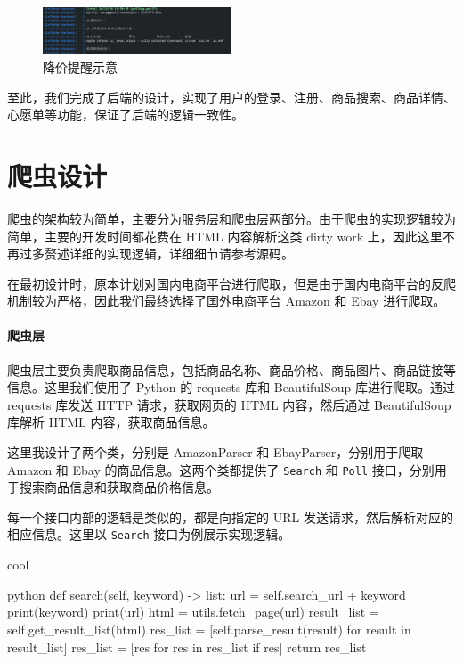 \begin{figure}[H]
\centering
\includegraphics[width=0.5\textwidth]{assets/report/polling.png}
\caption{降价提醒示意}
\end{figure}

至此，我们完成了后端的设计，实现了用户的登录、注册、商品搜索、商品详情、心愿单等功能，保证了后端的逻辑一致性。

\chapter{爬虫设计}

爬虫的架构较为简单，主要分为服务层和爬虫层两部分。由于爬虫的实现逻辑较为简单，主要的开发时间都花费在 HTML 内容解析这类 dirty work 上，因此这里不再过多赘述详细的实现逻辑，详细细节请参考源码。

在最初设计时，原本计划对国内电商平台进行爬取，但是由于国内电商平台的反爬机制较为严格，因此我们最终选择了国外电商平台 Amazon 和 Ebay 进行爬取。

\subsubsection{爬虫层}

爬虫层主要负责爬取商品信息，包括商品名称、商品价格、商品图片、商品链接等信息。这里我们使用了 Python 的 requests 库和 BeautifulSoup 库进行爬取。通过 requests 库发送 HTTP 请求，获取网页的 HTML 内容，然后通过 BeautifulSoup 库解析 HTML 内容，获取商品信息。

这里我设计了两个类，分别是 AmazonParser 和 EbayParser，分别用于爬取 Amazon 和 Ebay 的商品信息。这两个类都提供了 \texttt{Search} 和 \texttt{Poll} 接口，分别用于搜索商品信息和获取商品价格信息。

每一个接口内部的逻辑是类似的，都是向指定的 URL 发送请求，然后解析对应的相应信息。这里以 \texttt{Search} 接口为例展示实现逻辑。

\begin{codebox}{}{cool}
\begin{amzcode}{python}
    def search(self, keyword) -> list:
        url = self.search_url + keyword
        print(keyword)
        print(url)
        html = utils.fetch_page(url)
        result_list = self.get_result_list(html)
        res_list = [self.parse_result(result) for result in result_list]
        res_list = [res for res in res_list if res]
        return res_list
\end{amzcode}
\end{codebox}

